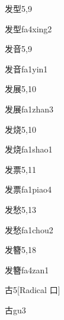 \begin{entry}{发型}{5,9}
  \begin{phonetics}{发型}{fa4xing2}
  \end{phonetics}
\end{entry}

\begin{entry}{发音}{5,9}
  \begin{phonetics}{发音}{fa1yin1}
  \end{phonetics}
\end{entry}

\begin{entry}{发展}{5,10}
  \begin{phonetics}{发展}{fa1zhan3}
  \end{phonetics}
\end{entry}

\begin{entry}{发烧}{5,10}
  \begin{phonetics}{发烧}{fa1shao1}
  \end{phonetics}
\end{entry}

\begin{entry}{发票}{5,11}
  \begin{phonetics}{发票}{fa1piao4}
  \end{phonetics}
\end{entry}

\begin{entry}{发愁}{5,13}
  \begin{phonetics}{发愁}{fa1chou2}
  \end{phonetics}
\end{entry}

\begin{entry}{发簪}{5,18}
  \begin{phonetics}{发簪}{fa4zan1}
  \end{phonetics}
\end{entry}

\begin{entry}{古}{5}[Radical ⼝]
  \begin{phonetics}{古}{gu3}
  \end{phonetics}
\end{entry}


